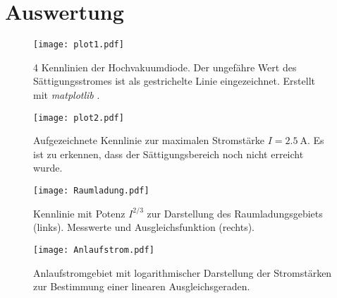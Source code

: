 \section{Auswertung}
\label{sec:Auswertung}

\begin{figure}
  \centering
  \texttt{[image: plot1.pdf]}
  \caption{4 Kennlinien der Hochvakuumdiode. Der ungefähre Wert des Sättigungsstromes ist als gestrichelte Linie eingezeichnet.
           Erstellt mit \textit{matplotlib} \cite{matplotlib}.}
  \label{fig:plot}
\end{figure}


\begin{figure}
  \centering
  \texttt{[image: plot2.pdf]}
  \caption{Aufgezeichnete Kennlinie zur maximalen Stromstärke $I = \qty{2.5}{\ampere}$. Es ist zu erkennen, dass der Sättigungsbereich noch nicht erreicht wurde.}
  \label{fig:plot2}
\end{figure}

\begin{figure}
  \centering
  \texttt{[image: Raumladung.pdf]}
  \caption{Kennlinie mit Potenz $I^{2/3}$ zur Darstellung des Raumladungsgebiets (links). Messwerte und Ausgleichsfunktion (rechts).}
  \label{fig:Raumladung}
\end{figure}

\begin{figure}
  \centering
  \texttt{[image: Anlaufstrom.pdf]}
  \caption{Anlaufstromgebiet mit logarithmischer Darstellung der Stromstärken zur Bestimmung einer linearen Ausgleichsgeraden.}
  \label{fig:Anlaufstrom}
\end{figure}
